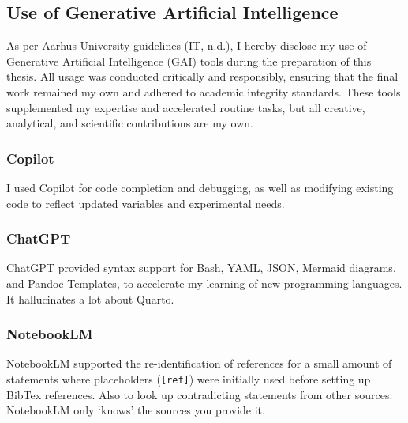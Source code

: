 \documentclass[
  11pt,
  a4paper,
]{scrbook}
\begin{document}
\subsection*{Use of Generative Artificial
Intelligence}\label{use-of-generative-artificial-intelligence}

As per Aarhus University guidelines (IT, n.d.), I hereby disclose my use
of Generative Artificial Intelligence (GAI) tools during the preparation
of this thesis. All usage was conducted critically and responsibly,
ensuring that the final work remained my own and adhered to academic
integrity standards. These tools supplemented my expertise and
accelerated routine tasks, but all creative, analytical, and scientific
contributions are my own.

\subsubsection*{Copilot}\label{copilot}

I used Copilot for code completion and debugging, as well as modifying
existing code to reflect updated variables and experimental needs.

\subsubsection*{ChatGPT}\label{chatgpt}

ChatGPT provided syntax support for Bash, YAML, JSON, Mermaid diagrams,
and Pandoc Templates, to accelerate my learning of new programming
languages. It hallucinates a lot about Quarto.

\subsubsection*{NotebookLM}\label{notebooklm}

NotebookLM supported the re-identification of references for a small
amount of statements where placeholders (\texttt{{[}ref{]}}) were
initially used before setting up BibTex references. Also to look up
contradicting statements from other sources. NotebookLM only `knows' the
sources you provide it.


\backmatter
\end{document}
